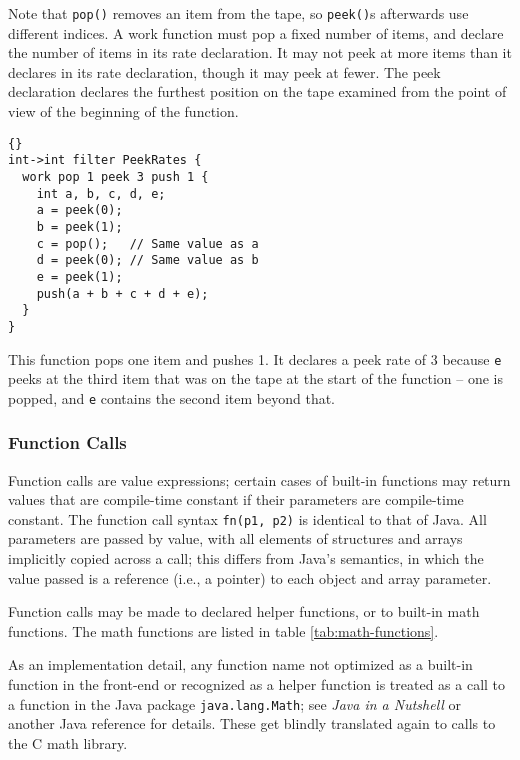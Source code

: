 \documentclass[11pt]{article}
\begin{document}
Note that \lstinline|pop()| removes an item from the tape, so
\lstinline|peek()|s afterwards use different indices.  A work function
must pop a fixed number of items, and declare the number of items in
its rate declaration.  It may not peek at more items than it declares
in its rate declaration, though it may peek at fewer.  The peek
declaration declares the furthest position on the tape examined from
the point of view of the beginning of the function.

\begin{lstlisting}{}
int->int filter PeekRates {
  work pop 1 peek 3 push 1 {
    int a, b, c, d, e;
    a = peek(0);
    b = peek(1);
    c = pop();   // Same value as a
    d = peek(0); // Same value as b
    e = peek(1);
    push(a + b + c + d + e);
  }
}
\end{lstlisting}

This function pops one item and pushes 1.  It declares a peek rate of
3 because \lstinline|e| peeks at the third item that was on the tape
at the start of the function -- one is popped, and \lstinline|e|
contains the second item beyond that.

\subsubsection{Function Calls}
\label{sec:expr-funcall}

Function calls are value expressions; certain cases of built-in
functions may return values that are compile-time constant if their
parameters are compile-time constant.  The function call syntax
\lstinline|fn(p1, p2)| is identical to that of Java.  All parameters
are passed by value, with all elements of structures and arrays
implicitly copied across a call; this differs from Java's semantics,
in which the value passed is a reference (i.e., a pointer) to each
object and array parameter.

Function calls may be made to declared helper functions, or to
built-in math functions.  The math functions are listed in table
\ref{tab:math-functions}.

\begin{note}
  As an implementation detail, any function name not optimized as a
  built-in function in the front-end or recognized as a %
  helper function is treated as a call to a function in the Java
  package \lstinline|java.lang.Math|; see \emph{Java in a Nutshell} or
  another Java reference for details.  These get blindly translated
  again to calls to the C math library.
\end{note}
\end{document}

